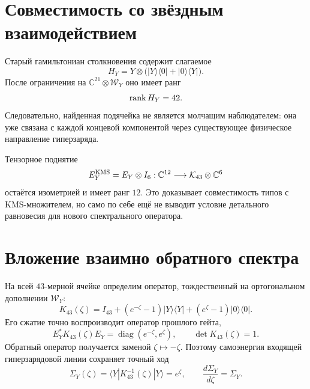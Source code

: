 \section{Совместимость со звёздным взаимодействием}

Старый гамильтониан столкновения содержит слагаемое
\begin{equation}
 H_Y=Y\otimes
 \bigl(|Y\rangle\langle0|+|0\rangle\langle Y|\bigr).
 \label{eq:v10-hypercharge-star-restriction}
\end{equation}
После ограничения на $\mathbb C^{21}\otimes\mathcal W_Y$ оно имеет ранг
\begin{equation}
 \operatorname{rank} H_Y=42.
 \label{eq:v10-hypercharge-star-rank}
\end{equation}
Следовательно, найденная подячейка не является молчащим наблюдателем: она
уже связана с каждой концевой компонентой через существующее физическое
направление гиперзаряда.

Тензорное поднятие
\begin{equation}
 E_Y^{\rm KMS}=E_Y\otimes I_6:
 \mathbb C^{12}\longrightarrow\mathcal K_{43}\otimes\mathbb C^6
 \label{eq:v10-k43-kms-lift}
\end{equation}
остаётся изометрией и имеет ранг $12$. Это доказывает совместимость типов с
KMS-множителем, но само по себе ещё не выводит условие детального равновесия
для нового спектрального оператора.

\section{Вложение взаимно обратного спектра}

На всей $43$-мерной ячейке определим оператор, тождественный на ортогональном
дополнении $\mathcal W_Y$:
\begin{equation}
 K_{43}(\zeta)
 =I_{43}+(e^{-\zeta}-1)|Y\rangle\langle Y|
 +(e^{\zeta}-1)|0\rangle\langle0|.
 \label{eq:v10-embedded-reciprocal-operator}
\end{equation}
Его сжатие точно воспроизводит оператор прошлого гейта,
\begin{equation}
 E_Y^*K_{43}(\zeta)E_Y
 =\operatorname{diag}(e^{-\zeta},e^{\zeta}),
 \qquad \det K_{43}(\zeta)=1.
 \label{eq:v10-embedded-reciprocal-compression}
\end{equation}
Обратный оператор получается заменой $\zeta\mapsto-\zeta$. Поэтому
самоэнергия входящей гиперзарядовой линии сохраняет точный ход
\begin{equation}
 \Sigma_Y(\zeta)
 =\langle Y|K_{43}^{-1}(\zeta)|Y\rangle=e^{\zeta},
 \qquad
 \frac{d\Sigma_Y}{d\zeta}=\Sigma_Y.
 \label{eq:v10-typed-hypercharge-self-energy}
\end{equation}

